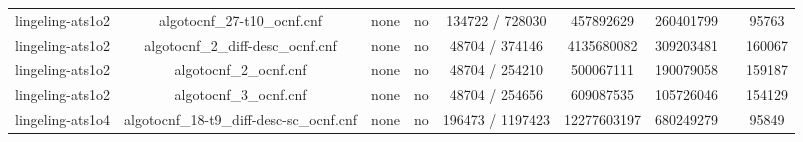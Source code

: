 \begin{appendices}
\begin{table}[p]
\begin{center}
\begin{tabular}{l|cccccccc}
  lingeling-ats1o2               & algotocnf\_27-t10\_ocnf.cnf    & none       & no    & 134722 / 728030 & 457892629 & 260401799 &            & 95763 \\ %
  lingeling-ats1o2               & algotocnf\_2\_diff-desc\_ocnf.cnf & none       & no    & 48704 / 374146 & 4135680082 & 309203481 &            & 160067 \\ %
  lingeling-ats1o2               & algotocnf\_2\_ocnf.cnf         & none       & no    & 48704 / 254210 & 500067111 & 190079058 &            & 159187 \\ %
  lingeling-ats1o2               & algotocnf\_3\_ocnf.cnf         & none       & no    & 48704 / 254656 & 609087535 & 105726046 &            & 154129 \\ %
  lingeling-ats1o4               & algotocnf\_18-t9\_diff-desc-sc\_ocnf.cnf & none       & no    & 196473 / 1197423 & 12277603197 & 680249279 &            & 95849 \\ %
    \end{tabular}
  \end{center}
\end{table}

\newpage


\end{appendices}
